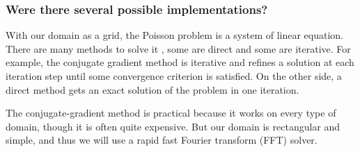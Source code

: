 \documentclass[accepted,single]{gipaper}
\begin{document}
\subsubsection{Were there several possible implementations?}

With our domain as a grid, the Poisson problem is a system of linear equation. There are many methods to solve it \cite{alim:ms,demmel}, some are direct and some are iterative.
For example, the conjugate gradient method is iterative and refines a solution at each iteration step until some convergence criterion is satisfied. On the other side, a direct method gets an exact solution of the problem in one iteration.

The conjugate-gradient method is practical because it works on every type of domain, though it is often quite expensive. But our domain is rectangular and simple, and thus we will use a rapid fast Fourier transform (FFT) solver.





\end{document}
